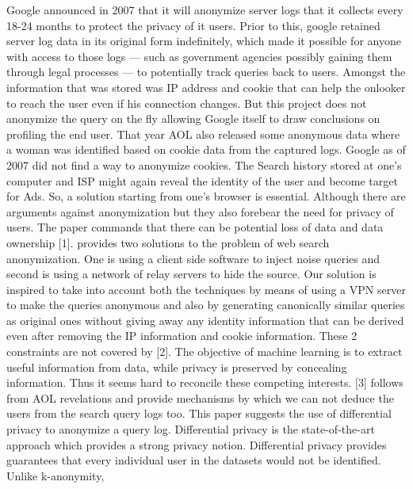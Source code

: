 \documentclass[11pt]{article}
\begin{document}
Google announced in 2007 that it will anonymize server logs that it collects every 18-24 months to protect the privacy of it users. Prior to this, google retained server log data in its original form indefinitely, which made it possible for anyone with access to those logs — such as government agencies possibly gaining them through legal processes — to potentially track queries back to users. Amongst the information that was stored was IP address and cookie that can help the onlooker to reach the user even if his connection changes. But this project does not anonymize the query on the fly allowing Google itself to draw conclusions on profiling the end user. That year AOL also released some anonymous data where a woman was identified based on cookie data from the captured logs. Google as of 2007 did not find a way to anonymize cookies. The Search history stored at one’s computer and ISP might again reveal the identity of the user and become target for Ads. So, a solution starting from one’s browser is essential. Although there are arguments against anonymization but they also forebear the need for privacy of users. The paper commands that there can be potential loss of data and data ownership [1]. \newline\newline
[2] provides two solutions to the problem of web search anonymization. One is using a client side software to inject noise queries and second is using a network of relay servers to hide the source. Our solution is inspired to take into account both the techniques by means of using a VPN server to make the queries anonymous and also by generating canonically similar queries as original ones without giving away any identity information that can be derived even after removing the IP information and cookie information. These 2 constraints are not covered by [2]. The objective of machine learning is to extract useful information from data, while privacy is preserved by concealing information. Thus it seems hard to reconcile these competing interests. [3] follows from AOL revelations and provide mechanisms by which we can not deduce the users from the search query logs too. This paper suggests the use of differential privacy to anonymize a query log. Differential privacy is the state-of-the-art approach which provides a strong privacy notion. Differential privacy provides guarantees
that every individual user in the datasets would not be identified. Unlike k-anonymity,
\end{document}
